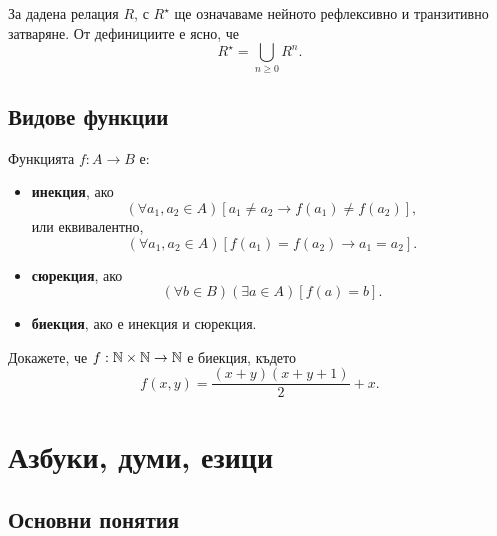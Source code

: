 За дадена релация $R$, с $R^\star$ ще означаваме нейното рефлексивно и транзитивно затваряне.
От дефинициите е ясно, че \[R^\star = \bigcup_{n\geq 0} R^n.\]

\subsection*{Видове функции}

Функцията $f:A \to B$ е:
\begin{itemize}
\item
  {\bf инекция}, ако 
  \[(\forall a_1,a_2\in A)[a_1\neq a_2 \rightarrow f(a_1)\neq f(a_2)],\]
  или еквивалентно,
  \[(\forall a_1,a_2\in A)[f(a_1) = f(a_2) \rightarrow a_1 = a_2].\]
\item
  {\bf сюрекция}, ако 
  \[(\forall b\in B)(\exists a\in A)[f(a) = b].\]
\item
  {\bf биекция}, ако е инекция и сюрекция.
\end{itemize}

\begin{problem}
  Докажете, че $f: \mathbb{N} \times \mathbb{N}\rightarrow \mathbb{N}$ е биекция, където
  \[f(x, y) = \frac{(x+y)(x+y+1)}{2} + x.\]
\end{problem}

\section{Азбуки, думи, езици}

\subsection*{Основни понятия}

